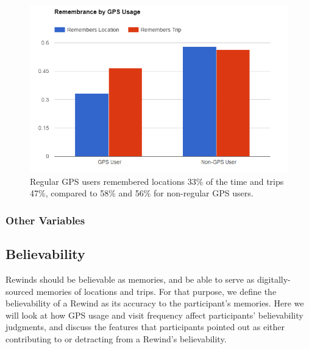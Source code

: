 \documentclass{sigchi}
\begin{document}
\begin{figure}
	\centering
	\includegraphics[width=1\linewidth]{GPS_remembrance_2}
	\caption{Regular GPS users remembered locations 33\% of the time and trips 47\%, compared to 58\% and 56\% for non-regular GPS users.}
	\label{fig:gpsmemory}
\end{figure}


\subsubsection{Other Variables}

\subsection{Believability}
Rewinds should be believable as memories, and be able to serve as digitally-sourced memories of locations and trips. For that purpose, we define the believability of a Rewind as its accuracy to the participant's memories. Here we will look at how GPS usage and visit frequency affect participants' believability judgments, and discuss the features that participants pointed out as either contributing to or detracting from a Rewind's believability.
\end{document}
